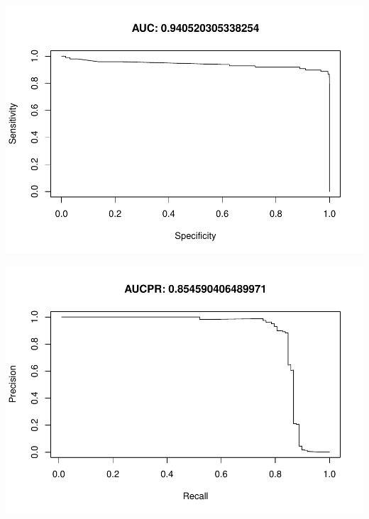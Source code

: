 \documentclass[]{article}
\begin{document}
\begin{center}\includegraphics{Credit_Card_Fraud_Detection_Project_Report_files/figure-latex/unnamed-chunk-23-2} \end{center}

\begin{center}\includegraphics{Credit_Card_Fraud_Detection_Project_Report_files/figure-latex/unnamed-chunk-23-3} \end{center}
\end{document}
